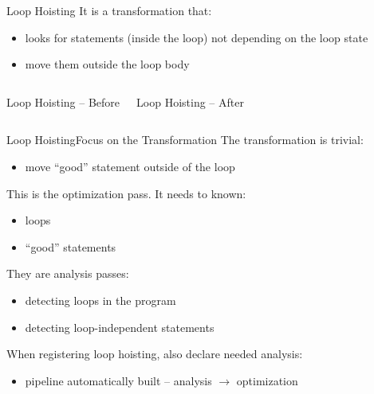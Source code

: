 \documentclass[10pt,mathserif]{beamer}
\newcommand{\cinput}[1]{}
\begin{document}
\begin{frame}{Loop Hoisting}
It is a transformation that:
\begin{itemize}
\item looks for statements (inside the loop) not depending on the loop state
\item move them outside the loop body
\end{itemize}

\begin{columns}[t]
\begin{block}{Loop Hoisting -- Before}
\centering
\cinput{snippet/01/loop-hoisting-before.c}
\end{block}

\begin{block}{Loop Hoisting -- After}
\centering
\cinput{snippet/01/loop-hoisting-after.c}
\end{block}
\end{columns}
\end{frame}


\begin{frame}{Loop Hoisting}{Focus on the Transformation}
The transformation is trivial:

\begin{itemize}
\item move ``good'' statement outside of the loop
\end{itemize}

This is the \alert{optimization pass}. It needs to known:

\begin{itemize}
\item loops
\item ``good'' statements
\end{itemize}

They are \alert{analysis} passes:

\begin{itemize}
\item detecting loops in the program
\item detecting loop-independent statements
\end{itemize}

When registering loop hoisting, also declare needed analysis:

\begin{itemize}
\item pipeline automatically built -- analysis $\rightarrow$ optimization
\end{itemize}
\end{frame}
\end{document}
